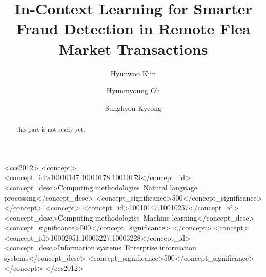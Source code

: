 \documentclass[sigconf]{acmart}
\begin{document}
\title{In-Context Learning for Smarter Fraud Detection in Remote Flea Market Transactions}



\author{Hyunwoo Kim}



\author{Hyunmyoung Oh}



\author{Sunghyon Kyeong}




\renewcommand{\shortauthors}{Kim et al.}

\begin{abstract}
this part is not ready yet.
\end{abstract}

\begin{CCSXML}
  <ccs2012>
    <concept>
      <concept_id>10010147.10010178.10010179</concept_id>
      <concept_desc>Computing methodologies~Natural language processing</concept_desc>
      <concept_significance>500</concept_significance>
    </concept>
    <concept>
      <concept_id>10010147.10010257</concept_id>
      <concept_desc>Computing methodologies~Machine learning</concept_desc>
      <concept_significance>500</concept_significance>
    </concept>
    <concept>
      <concept_id>10002951.10003227.10003228</concept_id>
      <concept_desc>Information systems~Enterprise information systems</concept_desc>
      <concept_significance>500</concept_significance>
    </concept>
  </ccs2012>
\end{CCSXML}
\end{document}
